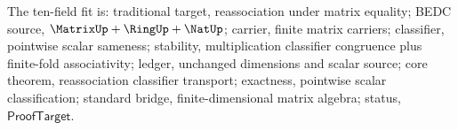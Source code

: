 The ten-field fit is: traditional target, reassociation under matrix equality; BEDC source, $\MatrixUp+\RingUp+\NatUp$; carrier, finite matrix carriers; classifier, pointwise scalar sameness; stability, multiplication classifier congruence plus finite-fold associativity; ledger, unchanged dimensions and scalar source; core theorem, reassociation classifier transport; exactness, pointwise scalar classification; standard bridge, finite-dimensional matrix algebra; status, $\mathsf{ProofTarget}$.
